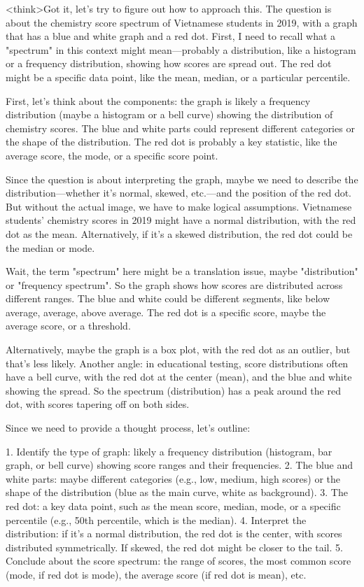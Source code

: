 <think>Got it, let's try to figure out how to approach this. The question is about the chemistry score spectrum of Vietnamese students in 2019, with a graph that has a blue and white graph and a red dot. First, I need to recall what a "spectrum" in this context might mean—probably a distribution, like a histogram or a frequency distribution, showing how scores are spread out. The red dot might be a specific data point, like the mean, median, or a particular percentile.

First, let's think about the components: the graph is likely a frequency distribution (maybe a histogram or a bell curve) showing the distribution of chemistry scores. The blue and white parts could represent different categories or the shape of the distribution. The red dot is probably a key statistic, like the average score, the mode, or a specific score point.

Since the question is about interpreting the graph, maybe we need to describe the distribution—whether it's normal, skewed, etc.—and the position of the red dot. But without the actual image, we have to make logical assumptions. Vietnamese students' chemistry scores in 2019 might have a normal distribution, with the red dot as the mean. Alternatively, if it's a skewed distribution, the red dot could be the median or mode.

Wait, the term "spectrum" here might be a translation issue, maybe "distribution" or "frequency spectrum". So the graph shows how scores are distributed across different ranges. The blue and white could be different segments, like below average, average, above average. The red dot is a specific score, maybe the average score, or a threshold.

Alternatively, maybe the graph is a box plot, with the red dot as an outlier, but that's less likely. Another angle: in educational testing, score distributions often have a bell curve, with the red dot at the center (mean), and the blue and white showing the spread. So the spectrum (distribution) has a peak around the red dot, with scores tapering off on both sides.

Since we need to provide a thought process, let's outline:

1. Identify the type of graph: likely a frequency distribution (histogram, bar graph, or bell curve) showing score ranges and their frequencies.
2. The blue and white parts: maybe different categories (e.g., low, medium, high scores) or the shape of the distribution (blue as the main curve, white as background).
3. The red dot: a key data point, such as the mean score, median, mode, or a specific percentile (e.g., 50th percentile, which is the median).
4. Interpret the distribution: if it's a normal distribution, the red dot is the center, with scores distributed symmetrically. If skewed, the red dot might be closer to the tail.
5. Conclude about the score spectrum: the range of scores, the most common score (mode, if red dot is mode), the average score (if red dot is mean), etc.

